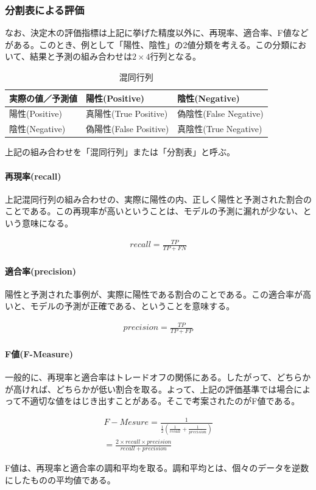 \documentclass[dvipdfmx]{jsarticle}
\begin{document}
\subsubsection{分割表による評価}
なお、決定木の評価指標は上記に挙げた精度以外に、再現率、適合率、F値などがある。このとき、例として「陽性、陰性」の2値分類を考える。この分類において、結果と予測の組み合わせは$2\times4$行列となる。
\begin{table}[H]
  \begin{center}
    \caption{混同行列}
    \begin{tabular}{|l|l|l|} \hline
      実際の値／予測値 & 陽性(Positive) & 陰性(Negative) \\ \hline
      陽性(Positive) & 真陽性(True Positive) & 偽陰性(False Negative)\\ \hline
      陰性(Negative)　& 偽陽性(False Positive) & 真陰性(True Negative) \\ \hline
    \end{tabular}
    \label{hyo02}
  \end{center}
\end{table}
上記の組み合わせを「混同行列」または「分割表」と呼ぶ。
\paragraph{再現率(recall)}\par
上記混同行列の組み合わせの、実際に陽性の内、正しく陽性と予測された割合のことである。この再現率が高いということは、モデルの予測に漏れが少ない、という意味になる。
\begin{center}
  \begin{align}
    recall = \frac{TP}{TP + FN}
  \end{align}
\end{center}
\paragraph{適合率(precision)} \par
陽性と予測された事例が、実際に陽性である割合のことである。この適合率が高いと、モデルの予測が正確である、ということを意味する。
\begin{center}
  \begin{align}
    precision = \frac{TP}{TP + FP}
  \end{align}
\end{center}
\paragraph{F値(F-Measure)}\par
一般的に、再現率と適合率はトレードオフの関係にある。したがって、どちらかが高ければ、どちらかが低い割合を取る。よって、上記の評価基準では場合によって不適切な値をはじき出すことがある。そこで考案されたのがF値である。
\begin{center}
  \begin{align*}
    F-Mesure = \frac{1}{\frac{1}{2}(\frac{1}{recall}+\frac{1}{precision})} \\
    = \frac{2\times recall\times precision}{recall + precision}
  \end{align*}
\end{center}
F値は、再現率と適合率の調和平均を取る。調和平均とは、個々のデータを逆数にしたものの平均値である。
\end{document}
